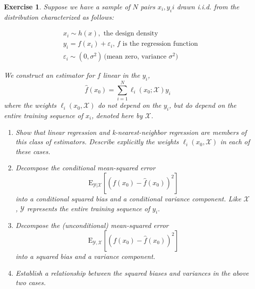 \documentclass[12pt]{article}
\def\eps{\varepsilon}
\def\E{\text{E}}
\newtheorem{exercise}{Exercise}[section]
\begin{document}
\begin{exercise}
    Suppose we have a sample of $N$ pairs $x_i, y_ii$ drawn i.i.d. from the distribution characterized as follows:
    \begin{center}
    $$\begin{aligned}&x_i \sim h(x), \text{ the design density}\\
    &y_i = f(x_i) + \varepsilon_i, \, f \text{ is the regression function}\\
    &\eps_i \sim (0, \sigma^2)\, \text{(mean zero, variance $\sigma^2$)}
    \end{aligned}$$
    \end{center}
    We construct an estimator for $f$ linear in the $y_i$,
$$\hat{f}(x_0) = \sum_{i = 1}^N \ell_i(x_0; \mathcal{X})y_i$$
where the weights $\ell_i(x_0, \mathcal{X})$ do not depend on the $y_i$, but do depend on the
entire training sequence of $x_i$, denoted here by $\mathcal{X}$.
\begin{enumerate}
\item[(a)] Show that linear regression and k-nearest-neighbor regression are members
of this class of estimators. Describe explicitly the weights $\ell_i(x_0, \mathcal{X})$
in each of these cases.
\item[(b)] Decompose the conditional mean-squared error
$$\E_{\mathcal{Y}| \mathcal{X}}[(f(x_0) - \hat{f}(x_0))^2]$$
into a conditional squared bias and a conditional variance component.
Like $\mathcal{X}$, $\mathcal{Y}$ represents the entire training sequence of $y_i$.
\item[(c)] Decompose the (unconditional) mean-squared error
$$\E_{\mathcal{Y}, \mathcal{X}}[(f(x_0) - \hat{f}(x_0))^2]$$
into a squared bias and a variance component.
\item[(d)] Establish a relationship between the squared biases and variances in
the above two cases.
\end{enumerate}
\end{exercise}
\end{document}
